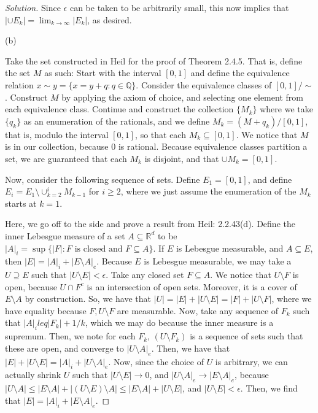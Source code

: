 \documentclass[10pt]{article}
\begin{document}
\begin{proof}[Solution]
Since $\epsilon$ can be taken to be arbitrarily small, this now implies that $|\cup E_k| = \lim_{k \to \infty} |E_k|$, as desired.

(b)

Take the set constructed in Heil for the proof of Theorem 2.4.5. That is, define the set $M$ as such: Start with the interval $[0,1]$ and define the equivalence relation $x \sim y = \{  x = y + q : q \in \mathbb{Q} \}$. Consider the equivalence classes of $[0,1]/\sim$. Construct $M$ by applying the axiom of choice, and selecting one element from each equivalence class. Continue and construct the collection $\{ M_k \}$ where we take $\{ q_k \}$ as an enumeration of the rationals, and we define $ M_k = (M + q_k)/[0,1]$, that is, modulo the interval $[0,1]$, so that each $M_k \subseteq [0,1]$. We notice that $M$ is in our collection, because $0$ is rational. Because equivalence classes partition a set, we are guaranteed that each $M_k$ is disjoint, and that $\cup M_k = [0,1]$.

Now, consider the following sequence of sets. Define $E_1 = [0,1]$, and define $E_i = E_{1} \setminus \cup_{k=2}^i M_{k-1}$ for $i \geq 2$, where we just assume the enumeration of the $M_k$ starts at $k=1$. 

Here, we go off to the side and prove a result from Heil: 2.2.43(d). Define the inner Lebesgue measure of a set $A \subseteq \mathbb{R}^d$ to be $|A|_i = \sup \{ |F| : F \text{ is closed and } F \subseteq A \}$. If $E$ is Lebesgue measurable, and $A \subseteq E$, then $|E| = |A|_i + |E \setminus A|_e$. Because $E$ is Lebesgue measurable, we may take a $U \supseteq E$ such that $|U \setminus E| < \epsilon$. Take any closed set $F \subseteq A$. We notice that $U \setminus F$ is open, because $U \cap F^c$ is an intersection of open sets. Moreover, it is a cover of $E \setminus A$ by construction. So, we have that $|U| = |E| + |U\setminus E| = |F| + |U \setminus F|$, where we have equality because $F, U \setminus F$ are measurable. Now, take any sequence of $F_k$ such that $|A|_i leq |F_k| + 1/k$, which we may do because the inner measure is a supremum. Then, we note for each $F_k$, $(U\setminus F_k)$ is a sequence of sets such that these are open, and converge to $|U \setminus A|_e$. Then, we have that $|E| + |U \setminus E| = |A|_i + |U \setminus A|_e$. Now, since the choice of $U$ is arbitrary, we can actually shrink $U$ such that $|U \setminus E| \to 0$, and $|U \setminus A|_e \to |E \setminus A|_e$, because $|U \setminus A | \leq |E \setminus A| + |(U \setminus E) \setminus A| \leq |E \setminus A| + |U \setminus E|$, and $| U \setminus E| < \epsilon$. Then, we find that $|E| = |A|_i + |E \setminus A|_e$.


\end{proof}
\end{document}

